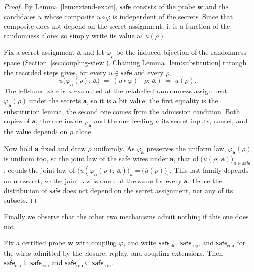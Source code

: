   \begin{proof}
  By Lemma~\ref{lem:extend-exact}, $\mathsf{safe}$ consists of the probe $\mathbf{w}$
  and the candidates $u$ whose composite $u \circ \varphi$ is independent of the
  secrets. Since that composite does not depend on the secret assignment, it is a
  function of the randomness alone; so simply write its value as $\overline{u}(\rho)$.

  Fix a secret assignment $\mathbf{a}$ and let $\varphi_{\mathbf{a}}$ be the induced
  bijection of the randomness space
  (Section~\ref{sec:coupling-view}). Chaining Lemma~\ref{lem:substitution} through
  the recorded steps gives, for every $u \in \mathsf{safe}$ and every $\rho$,
  \[
    u\big(\varphi_{\mathbf{a}}(\rho);\, \mathbf{a}\big)
    \;=\; (u \circ \varphi)(\rho;\, \mathbf{a})
    \;=\; \overline{u}(\rho) .
  \]
  The left-hand side is $u$ evaluated at the relabelled randomness assignment
  $\varphi_{\mathbf{a}}(\rho)$ under the secrets $\mathbf{a}$, so it is a bit value;
  the first equality is the substitution lemma, the second one comes from the
  admission condition. Both copies of
  $\mathbf{a}$, the one inside $\varphi_{\mathbf{a}}$ and the one feeding $u$ its
  secret inputs, cancel, and the value depends on $\rho$ alone.

  Now hold $\mathbf{a}$ fixed and draw $\rho$ uniformly. As $\varphi_{\mathbf{a}}$
  preserves the uniform law, $\varphi_{\mathbf{a}}(\rho)$ is uniform too, so the
  joint law of the safe wires under $\mathbf{a}$, that of
  $\big(u(\rho;\, \mathbf{a})\big)_{u \in \mathsf{safe}}$, equals the joint law of
  $\big(u(\varphi_{\mathbf{a}}(\rho);\, \mathbf{a})\big)_{u} =
  \big(\overline{u}(\rho)\big)_{u}$. This last family depends on no secret, so the
  joint law is one and the same for every $\mathbf{a}$. Hence the distribution of
  $\mathsf{safe}$ does not depend on the secret assignment, nor any of its subsets.
  \end{proof}

  Finally we observe that the other two mechanisms admit nothing if this one does not.

  \begin{proposition}
  \label{prop:nesting}
  Fix a certified probe $\mathbf{w}$ with coupling $\varphi$, and write
  $\mathsf{safe}_{\mathrm{clo}}$, $\mathsf{safe}_{\mathrm{rep}}$, and
  $\mathsf{safe}_{\mathrm{cou}}$ for the wires admitted by the closure, replay, and
  coupling extensions. Then $\mathsf{safe}_{\mathrm{clo}} \subseteq
  \mathsf{safe}_{\mathrm{cou}}$ and $\mathsf{safe}_{\mathrm{rep}} \subseteq
  \mathsf{safe}_{\mathrm{cou}}$.
  \end{proposition}

